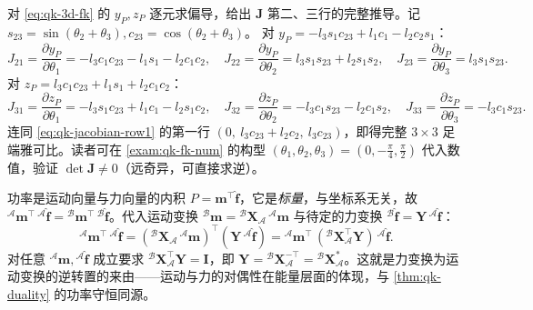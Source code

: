 \begin{derivation}\label{deriv:qk-jacobian}
对 \cref{eq:qk-3d-fk} 的 $y_P,z_P$ 逐元求偏导，给出 $\mathbf{J}$ 第二、三行的完整推导。记 $s_{23}=\sin(\theta_2+\theta_3),c_{23}=\cos(\theta_2+\theta_3)$。
对 $y_P=-l_3 s_1 c_{23}+l_1 c_1-l_2 c_2 s_1$：
\[
  J_{21}=\frac{\partial y_P}{\partial\theta_1}=-l_3 c_1 c_{23}-l_1 s_1-l_2 c_1 c_2,\quad
  J_{22}=\frac{\partial y_P}{\partial\theta_2}=l_3 s_1 s_{23}+l_2 s_1 s_2,\quad
  J_{23}=\frac{\partial y_P}{\partial\theta_3}=l_3 s_1 s_{23}.
\]
对 $z_P=l_3 c_1 c_{23}+l_1 s_1+l_2 c_1 c_2$：
\[
  J_{31}=\frac{\partial z_P}{\partial\theta_1}=-l_3 s_1 c_{23}+l_1 c_1-l_2 s_1 c_2,\quad
  J_{32}=\frac{\partial z_P}{\partial\theta_2}=-l_3 c_1 s_{23}-l_2 c_1 s_2,\quad
  J_{33}=\frac{\partial z_P}{\partial\theta_3}=-l_3 c_1 s_{23}.
\]
连同 \cref{eq:qk-jacobian-row1} 的第一行 $(0,\ l_3 c_{23}+l_2 c_2,\ l_3 c_{23})$，即得完整 $3\times3$ 足端雅可比。读者可在 \cref{exam:qk-fk-num} 的构型 $(\theta_1,\theta_2,\theta_3)=(0,-\tfrac{\pi}{4},\tfrac{\pi}{2})$ 代入数值，验证 $\det\mathbf{J}\neq0$（远奇异，可直接求逆）。
\end{derivation}

\begin{derivation}[Plücker 力变换 $\mathbf{X}^{*}=\mathbf{X}^{-\top}$ 由保功率导出（\cref{eq:qk-plucker-X}）]\label{deriv:qk-plucker-dual}
功率是运动向量与力向量的内积 $P=\boldsymbol{m}^\top\hat{\boldsymbol{f}}$，它是\emph{标量}，与坐标系无关，故 ${}^{\mathcal{A}}\boldsymbol{m}^\top\,{}^{\mathcal{A}}\hat{\boldsymbol{f}}={}^{\mathcal{B}}\boldsymbol{m}^\top\,{}^{\mathcal{B}}\hat{\boldsymbol{f}}$。代入运动变换 ${}^{\mathcal{B}}\boldsymbol{m}={}^{\mathcal{B}}\mathbf{X}_{\mathcal{A}}\,{}^{\mathcal{A}}\boldsymbol{m}$ 与待定的力变换 ${}^{\mathcal{B}}\hat{\boldsymbol{f}}=\mathbf{Y}\,{}^{\mathcal{A}}\hat{\boldsymbol{f}}$：
\[
  {}^{\mathcal{A}}\boldsymbol{m}^\top\,{}^{\mathcal{A}}\hat{\boldsymbol{f}}
  =({}^{\mathcal{B}}\mathbf{X}_{\mathcal{A}}\,{}^{\mathcal{A}}\boldsymbol{m})^\top(\mathbf{Y}\,{}^{\mathcal{A}}\hat{\boldsymbol{f}})
  ={}^{\mathcal{A}}\boldsymbol{m}^\top\,({}^{\mathcal{B}}\mathbf{X}_{\mathcal{A}}^\top\mathbf{Y})\,{}^{\mathcal{A}}\hat{\boldsymbol{f}}.
\]
对任意 ${}^{\mathcal{A}}\boldsymbol{m},{}^{\mathcal{A}}\hat{\boldsymbol{f}}$ 成立要求 ${}^{\mathcal{B}}\mathbf{X}_{\mathcal{A}}^\top\mathbf{Y}=\mathbf{I}$，即 $\mathbf{Y}={}^{\mathcal{B}}\mathbf{X}_{\mathcal{A}}^{-\top}={}^{\mathcal{B}}\mathbf{X}_{\mathcal{A}}^{*}$。这就是力变换为运动变换的逆转置的来由——运动与力的对偶性在能量层面的体现，与 \cref{thm:qk-duality} 的功率守恒同源。
\end{derivation}


